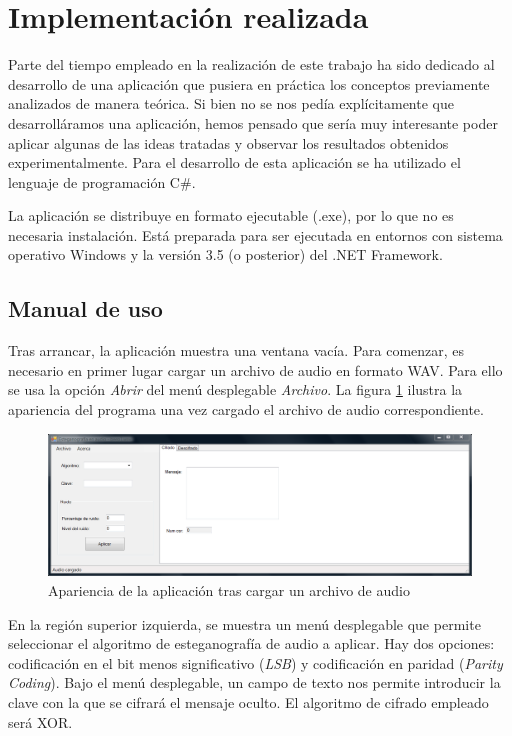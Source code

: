 \documentclass[12pt]{article}
\begin{document}
\newpage
\section{Implementación realizada}

Parte del tiempo empleado en la realización de este trabajo ha sido dedicado al desarrollo de una aplicación que pusiera en práctica los conceptos previamente analizados de manera teórica. Si bien no se nos pedía explícitamente que desarrolláramos una aplicación, hemos pensado que sería muy interesante poder aplicar algunas de las ideas tratadas y observar los resultados obtenidos experimentalmente. Para el desarrollo de esta aplicación se ha utilizado el lenguaje de programación C\#.

La aplicación se distribuye en formato ejecutable (.exe), por lo que no es necesaria instalación. Está preparada para ser ejecutada en entornos con sistema operativo Windows y la versión 3.5 (o posterior) del .NET Framework.

\subsection{Manual de uso}

Tras arrancar, la aplicación muestra una ventana vacía. Para comenzar, es necesario en primer lugar cargar un archivo de audio en formato WAV. Para ello se usa la opción \emph{Abrir} del menú desplegable \emph{Archivo}. La figura \ref{ss1} ilustra la apariencia del programa una vez cargado el archivo de audio correspondiente.

\begin{figure}[h]
  \centering
    \includegraphics[width=\textwidth]{img/ss1}
  \caption{Apariencia de la aplicación tras cargar un archivo de audio}
  \label{ss1}
\end{figure}

En la región superior izquierda, se muestra un menú desplegable que permite seleccionar el algoritmo de esteganografía de audio a aplicar. Hay dos opciones: codificación en el bit menos significativo (\emph{LSB}) y codificación en paridad (\emph{Parity Coding}). Bajo el menú desplegable, un campo de texto nos permite introducir la clave con la que se cifrará el mensaje oculto. El algoritmo de cifrado empleado será XOR.
\end{document}
